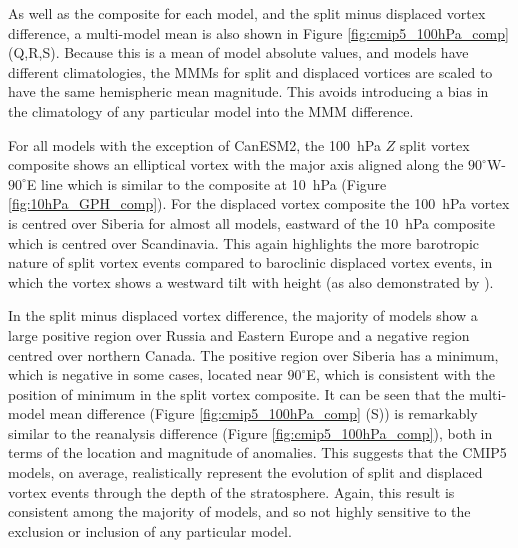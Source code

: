 As well as the composite for each model, and the split minus displaced vortex
difference, a multi-model mean is also shown in Figure
\ref{fig:cmip5_100hPa_comp} (Q,R,S). Because this is a mean of model absolute
values, and models have different climatologies, the MMMs for split and
displaced vortices are scaled to have the same hemispheric mean magnitude. This
avoids introducing a bias in the climatology of any particular model into the
MMM difference. 

For all models with the exception of CanESM2, the 100~hPa $Z$ split vortex
composite shows an elliptical vortex with the major axis aligned along the
$90^{\circ}$W-$90^{\circ}$E line which is similar to the composite at 10~hPa
(Figure \ref{fig:10hPa_GPH_comp}). For the displaced vortex composite the
100~hPa vortex is centred over Siberia for almost all models, eastward of the
10~hPa composite which is centred over Scandinavia. This again highlights the
more barotropic nature of split vortex events compared to baroclinic displaced
vortex events, in which the vortex shows a westward tilt with height (as also
demonstrated by \citet{Matthewman2009}).

In the split minus displaced vortex difference, the majority of models show a
large positive region over Russia and Eastern Europe and a negative region
centred over northern Canada. The positive region over Siberia has a minimum,
which is negative in some cases, located near $90^{\circ}$E, which is consistent
with the position of minimum in the split vortex composite. It can be seen that
the multi-model mean difference (Figure \ref{fig:cmip5_100hPa_comp} (S)) is
remarkably similar to the reanalysis difference (Figure
\ref{fig:cmip5_100hPa_comp}), both in terms of the location and magnitude of
anomalies. This suggests that the CMIP5 models, on average, realistically
represent the evolution of split and displaced vortex events through the depth
of the stratosphere. Again, this result is consistent among the majority of
models, and so not highly sensitive to the exclusion or inclusion of any
particular model. 

